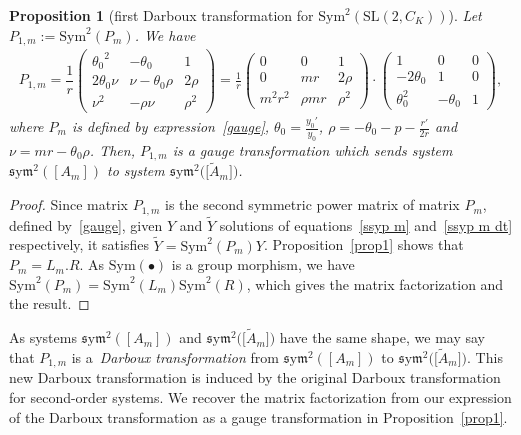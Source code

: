 \documentclass[pdftex]{sigma}%
\numberwithin{equation}{section}
\newtheorem{Proposition}[Theorem]{Proposition}
 { \theoremstyle{definition}
\newtheorem{Definition}[Theorem]{Definition}
\newtheorem{Note}[Theorem]{Note}
\newtheorem{Example}[Theorem]{Example}
\newtheorem{Remark}[Theorem]{Remark} }
\def\Sym{\mathrm{Sym}}
\def\sym{\mathfrak{s}\mathrm{y}\mathfrak{m}}
\begin{document}
\begin{Proposition}[first Darboux transformation for $\Sym^2 (\mathrm{SL}(2,C_K))$] \label{thnudarsl21}
Let $P_{1,m}:= \Sym^2 (P_{m})$.
We have %
\begin{gather} \label{eq:DT sl2}
P_{1,m} = \dfrac{1}{r}
\begin{pmatrix} {\theta_0}^{2}&-\theta_0&1 \\ 2 \theta_0
\nu & \nu-\theta_0 \rho& 2 \rho \\
\nu^{2}& -\rho \nu&{\rho}^{2}
 	\end{pmatrix} 	=
	 \frac{1}{r} \begin{pmatrix} 0&0&1\\ 0&mr&2 \rho
\\ {m}^{2}{r}^{2}&\rho mr&{\rho}^{2}\end{pmatrix} \cdot
\begin{pmatrix} 1&0&0\\ -2 \theta_{{0}}
&1&0\\ \theta_{{0}}^{2}&-\theta_{{0}}&1
\end{pmatrix}\!,
\end{gather}
where $P_m$ is defined by expression~\eqref{gauge},
	$\theta_0= \frac{y_0'}{y_0}$, $\rho = -\theta_0- p - \frac{r'}{2r}$
	and $\nu=mr-\theta_0 \rho$.
Then, $P_{1,m}$ is a gauge transformation which sends system $\sym^2 ([A_m])$ to system $\sym^2 \big(\big[\widetilde{A}_m\big]\big)$.
\end{Proposition}

\begin{proof}Since matrix $P_{1,m}$ is the second symmetric power matrix of matrix $P_m$, defined by~\eqref{gauge}, given $Y$ and $\widetilde{Y}$ solutions of equations~\eqref{ssyp m} and~\eqref{ssyp m dt} respectively, it satisfies $\widetilde{Y} = \Sym^2 (P_{m}) Y$.
 Proposition~\ref{prop1} shows that $P_{m} = L_m. R$. As $\Sym(\bullet)$ is a group morphism, we have
$\Sym^2(P_m)=\Sym^2(L_m)\Sym^2(R)$, which gives the matrix factorization and the result.
\end{proof}

As systems $\sym^2 ([A_m])$ and $\sym^2 \big(\big[\widetilde{A}_m\big]\big)$ have the same shape, we may say that $P_{1,m}$ is a~\emph{Dar\-boux transformation} from $\sym^2 ([A_m])$ to $\sym^2 \big(\big[\widetilde{A}_m\big]\big)$.
This new Darboux transformation is induced by the original Darboux transformation for second-order systems. We recover the matrix factorization from our expression of the Darboux transformation as a gauge transformation in Proposition~\ref{prop1}.
\end{document}
